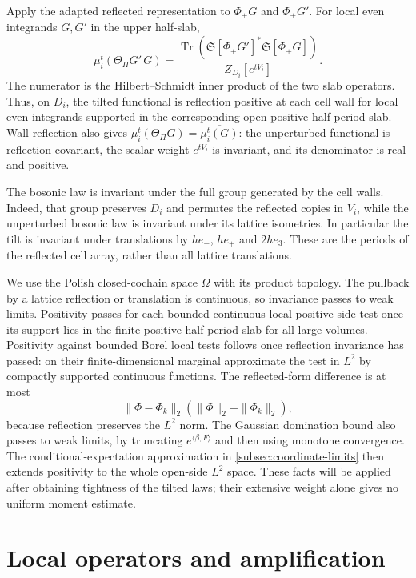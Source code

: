 Apply the adapted reflected representation to $\Phi_+G$ and
$\Phi_+G'$. For local even integrands $G,G'$ in the upper half-slab,
\begin{equation}\label{eq:diag-tilted-positive-form}
 \mu_i^t(\Theta_\Pi G'\,G)=
 \frac{\operatorname{Tr}
          (\mathfrak S[\Phi_+G']^*\mathfrak S[\Phi_+G])}
      {Z_{D_i}[e^{tV_i}]}.
\end{equation}
The numerator is the Hilbert--Schmidt inner product of the two slab
operators. Thus, on $D_i$, the tilted functional is reflection positive
at each cell wall for local even integrands supported in the corresponding
open positive half-period slab. Wall reflection also gives
$\mu_i^t(\Theta_\Pi G)=\overline{\mu_i^t(G)}$: the unperturbed
functional is reflection covariant, the scalar weight $e^{tV_i}$
is invariant, and its denominator is real and positive.

The bosonic law is invariant under the full group generated by the
cell walls. Indeed, that group preserves $D_i$ and permutes the
reflected copies in $V_i$, while the unperturbed bosonic law is
invariant under its lattice isometries. In particular the tilt is
invariant under translations by $he_-$, $he_+$ and $2he_3$.
These are the periods of the reflected cell array, rather than all
lattice translations.

We use the Polish closed-cochain space $\Omega$ with its product
topology. The pullback by a lattice reflection or
translation is continuous, so invariance passes to weak limits.
Positivity passes for each bounded continuous local positive-side test
once its support lies in the finite positive half-period slab for all
large volumes. Positivity against bounded Borel local tests follows once reflection invariance
has passed: on their finite-dimensional marginal approximate the
test in $L^2$ by compactly supported continuous functions. The
reflected-form difference is at most
\[
 \|\Phi-\Phi_k\|_2(\|\Phi\|_2+\|\Phi_k\|_2),
\]
because reflection preserves the $L^2$ norm. The Gaussian domination
bound also passes to weak limits, by truncating
$e^{\langle\beta,F\rangle}$ and then using monotone convergence.
The conditional-expectation approximation in
\cref{subsec:coordinate-limits} then extends positivity to the whole
open-side $L^2$ space. These facts will be applied after obtaining tightness of the tilted
laws; their extensive weight alone gives no uniform moment estimate.

\section{Local operators and amplification}\label{sec:local-amplification}

